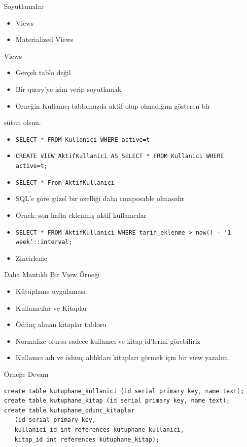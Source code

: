 \documentclass[presentation]{beamer}
\begin{document}
\begin{frame}[label=sec-28]{Soyutlamalar}
\begin{itemize}
\item Views
\item Materialized Views
\end{itemize}
\end{frame}

\begin{frame}[fragile,label=sec-29]{Views}
 \begin{itemize}
\item Gerçek tablo değil
\item Bir query'ye isim verip soyutlamak
\item Örneğin Kullanıcı tablomuzda aktif olup olmadığını gösteren bir
\end{itemize}
sütun olsun.
\begin{itemize}
\item \texttt{SELECT * FROM Kullanici WHERE active=t}
\item \texttt{CREATE VIEW AktifKullanici AS SELECT * FROM Kullanici WHERE active=t;}
\item \texttt{SELECT * From AktifKullanıcı}
\item SQL'e göre güzel bir özelliği daha composable olmasıdır
\item Örnek: son hafta eklenmiş aktif kullanıcılar
\item \texttt{SELECT * FROM AktifKullanici WHERE tarih\_eklenme > now() - '1 week'::interval;}
\item Zincirleme
\end{itemize}
\end{frame}

\begin{frame}[label=sec-30]{Daha Mantıklı Bir View Örneği}
\begin{itemize}
\item Kütüphane uygulaması
\item Kullanıcılar ve Kitaplar
\item Ödünç alınan kitaplar tablosu
\item Normalize olursa sadece kullanıcı ve kitap id'lerini görebiliriz
\item Kullanıcı adı ve ödünç aldıkları kitapları görmek için bir view yazalım.
\end{itemize}
\end{frame}

\begin{frame}[fragile,label=sec-31]{Örneğe Devam}
 \begin{verbatim}
create table kutuphane_kullanici (id serial primary key, name text);
create table kutuphane_kitap (id serial primary key, name text);
create table kutuphane_odunc_kitaplar
   (id serial primary key,
   kullanici_id int references kutuphane_kullanici,
   kitap_id int references kütüphane_kitap);
\end{verbatim}
\end{frame}
\end{document}
